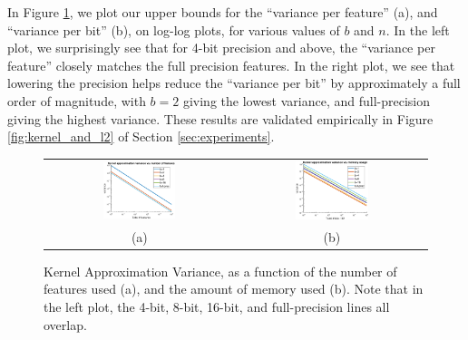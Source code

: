 \documentclass[12pt]{article}
\begin{document}
In Figure \ref{fig:kernel_approx_var}, we plot our upper bounds for the ``variance per feature'' (a), and ``variance per bit'' (b), on log-log plots, for various values of $b$ and $n$.
In the left plot, we surprisingly see that for 4-bit precision and above, the ``variance per feature'' closely matches the full precision features.  In the right plot, we see that lowering the precision helps reduce the ``variance per bit'' by approximately a full order of magnitude, with $b=2$ giving the lowest variance, and full-precision giving the highest variance.  These results are validated empirically in Figure \ref{fig:kernel_and_l2} of Section \ref{sec:experiments}.

\begin{figure}
	\centering
	\begin{tabular}{c c}
		\includegraphics[width=0.4\textwidth]{figures/var_vs_numfeat.eps} &
		\includegraphics[width=0.4\textwidth]{figures/var_vs_numbits.eps}  \\
		(a) & (b) \\
	\end{tabular}
	\caption{Kernel Approximation Variance, as a function of the number of features used (a), and the amount of memory used (b).  Note that in the left plot, the 4-bit, 8-bit, 16-bit, and full-precision lines all overlap.}
\label{fig:kernel_approx_var}
\end{figure}
\end{document}
